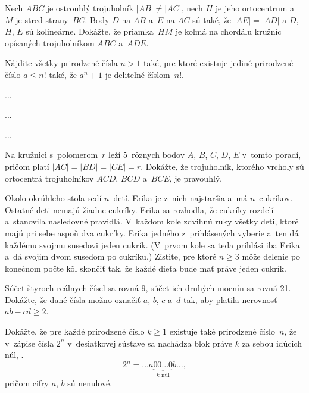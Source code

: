 {%
Nech $ABC$ je ostrouhlý trojuholník $|AB|\ne |AC|$, nech $H$ je jeho ortocentrum a~$M$
je stred strany~$BC$. Body $D$ na $AB$ a~$E$ na $AC$ sú také, že $|AE|=|AD|$
a $D$, $H$, $E$ sú kolineárne.
Dokážte, že priamka~$HM$ je kolmá na chordálu kružníc opísaných trojuholníkom
$ABC$ a~$ADE$.
}

{%
Nájdite všetky prirodzené čísla $n>1$ také, pre ktoré
existuje jediné prirodzené číslo $a\le n!$ také, že $a^n+1$ je
deliteľné číslom~$n!$.
}

{%
...}

{%
...}

{%
...}

{%
Na kružnici s~polomerom~$r$ leží 5~rôznych bodov $A$, $B$, $C$, $D$, $E$ v~tomto poradí, pričom platí $|AC|=|BD|=|CE|=r$. Dokážte, že trojuholník, ktorého vrcholy sú ortocentrá trojuholníkov $ACD$, $BCD$ a~$BCE$, je pravouhlý.}

{%
Okolo okrúhleho stola sedí $n$~detí. Erika je z~nich najstaršia a~má $n$~cukríkov. Ostatné deti nemajú žiadne cukríky. Erika sa rozhodla, že cukríky rozdelí a~stanovila nasledovné pravidlá. V~každom kole zdvihnú ruky všetky deti, ktoré majú pri sebe aspoň dva cukríky. Erika jedného z~prihlásených vyberie a~ten dá každému svojmu susedovi jeden cukrík. (V~prvom kole sa teda prihlási iba Erika a~dá svojim dvom susedom po cukríku.) Zistite, pre ktoré $n\ge3$ môže delenie po konečnom počte kôl skončiť tak, že každé dieťa bude mať práve jeden cukrík.}

{%
Súčet štyroch reálnych čísel sa rovná 9, súčet ich druhých mocnín sa rovná 21. Dokážte, že dané čísla možno označiť $a$, $b$, $c$ a~$d$ tak, aby platila nerovnosť $ab-cd\ge2$.}

{%
Dokážte, že pre každé prirodzené číslo $k\ge1$ existuje také prirodzené číslo~$n$, že v~zápise čísla $2^n$ v~desiatkovej sústave sa nachádza blok práve $k$ za sebou idúcich núl, \tj.
$$
  2^n=\dots a\underbrace{00\dots0}_{\text{$k$~núl}}b\dots,
$$
pričom cifry $a$, $b$ sú nenulové.}


